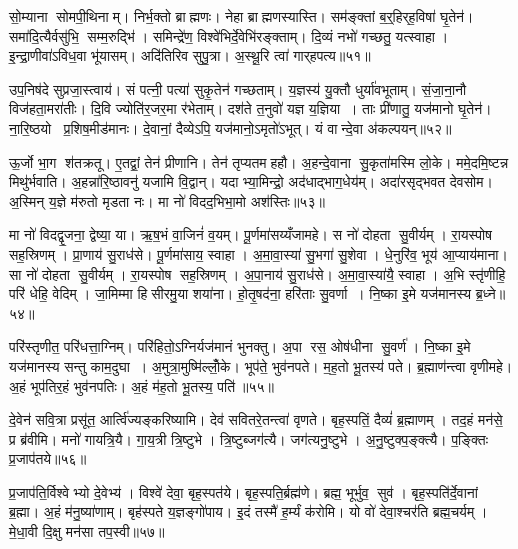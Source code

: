 सो॒म्याना सोमपी॒थिनाम्। निर्भ॒क्तो ब्राह्मणः। नेहा ब्राह्मणस्यास्ति। सम॑ङ्क्तां ब॒र्॒हिर्‌ह॒विषा॑ घृ॒तेन॑। समा॑दि॒त्यैर्वसु॑भि॒ सम्म॒रुद्भि॑। समिन्द्रे॑ण॒ विश्वे॑भिर्दे॒वेभि॑रङ्क्ताम्। दि॒व्यं नभो॑ गच्छतु॒ यत्स्वाहा। इ॒न्द्रा॒णीवा॑ऽविध॒वा भू॑यासम्। अदि॑तिरिव सुपु॒त्रा। अ॒स्थू॒रि त्वा॑ गार्‌हपत्य॥५१॥

उप॒निष॑दे सुप्रजा॒स्त्वाय॑। सं पत्नी॒ पत्या॑ सुकृ॒तेन॑ गच्छताम्। य॒ज्ञस्य॑ यु॒क्तौ धुर्या॑वभूताम्। सं॒जा॒ना॒नौ विज॑हता॒मरा॑तीः। दि॒वि ज्योति॑र॒जर॒मा र॑भेताम्। दश॑ते त॒नुवो॑ यज्ञ य॒ज्ञिया। ताः प्री॑णातु॒ यज॑मानो घृ॒तेन॑। ना॒रि॒ष्ठयो प्र॒शिष॒मीड॑मानः। दे॒वानां॒ दैव्येऽपि॒ यज॑मानो॒ऽमृतो॑ऽभूत्। यं वान्दे॒वा अ॑कल्पयन्॥५२॥

ऊ॒र्जो भा॒ग श॑तक्रतू। ए॒तद्वां॒ तेन॑ प्रीणानि। तेन॑ तृप्यतमहहौ। अ॒हन्दे॒वाना सु॒कृता॑मस्मि लो॒के। ममे॒दमि॒ष्टन्न मिथु॑र्भवाति। अ॒हन्ना॑रि॒ष्ठावनु॑ यजामि वि॒द्वान्। यदाभ्या॒मिन्द्रो॒ अद॑धाद्भाग॒धेय॑म्। अदा॑रसृद्भवत देवसोम। अ॒स्मिन् य॒ज्ञे म॑रुतो मृडता नः। मा नो॑ विदद॒भिभा॒मो अश॑स्तिः॥५३॥

मा नो॑ विदद्वृ॒जना॒ द्वेष्या॒ या। ऋ॒ष॒भं वा॒जिनं॑ व॒यम्। पू॒र्णमा॑सय्यँजामहे। स नो॑ दोहता सु॒वीर्यम्। रा॒यस्पोष सह॒स्रिणम्। प्रा॒णाय॑ सु॒राध॑से। पू॒र्णमा॑साय॒ स्वाहा। अ॒मा॒वा॒स्या॑ सु॒भगा॑ सु॒शेवा। धे॒नुरि॑व॒ भूय॑ आ॒प्याय॑माना। सा नो॑ दोहता सु॒वीर्यम्। रा॒यस्पोष सह॒स्रिणम्। अ॒पा॒नाय॑ सु॒राध॑से। अ॒मा॒वा॒स्या॑यै॒ स्वाहा। अ॒भि स्तृ॑णीहि॒ परि॑ धेहि॒ वेदिम्। जा॒मिम्मा हिसीरमु॒या शया॑ना। हो॒तृ॒षद॑ना॒ हरि॑ताः सु॒वर्णा। नि॒ष्का इ॒मे यज॑मानस्य ब्र॒ध्ने॥५४॥

परि॑स्तृणीत॒ परि॑धत्ता॒ग्निम्। परि॑हितो॒ऽग्निर्यज॑मानं भुनक्तु। अ॒पा रस॒ ओष॑धीना सु॒वर्ण॑। नि॒ष्का इ॒मे यज॑मानस्य सन्तु काम॒दुघा। अ॒मुत्रा॒मुष्मि॑ल्लोँ॒के। भूप॑ते॒ भुव॑नपते। म॒ह॒तो भू॒तस्य॑ पते। ब्र॒ह्माण॑न्त्वा वृणीमहे। अ॒हं भूप॑तिर॒हं भुव॑नपतिः। अ॒हं म॑ह॒तो भू॒तस्य॒ पति॑॥५५॥

दे॒वेन॑ सवि॒त्रा प्रसू॑त॒ आर्त्वि॑ज्यङ्करिष्यामि। देव॑ सवितरे॒तन्त्वा॑ वृणते। बृह॒स्पतिं॒ दैव्यं॑ ब्र॒ह्माणम्। तद॒हं मन॑से॒ प्र ब्र॑वीमि। मनो॑ गायत्रि॒यै। गा॒य॒त्री त्रि॒ष्टुभे। त्रि॒ष्टुब्जग॑त्यै। जग॑त्यनु॒ष्टुभे। अ॒नु॒ष्टुक्प॒ङ्क्त्यै। प॒ङ्क्तिः प्र॒जाप॑तये॥५६॥

प्र॒जाप॑ति॒र्विश्वेभ्यो दे॒वेभ्य॑। विश्वे॑ देवा॒ बृह॒स्पत॑ये। बृह॒स्पति॒र्ब्रह्म॑णे। ब्रह्म॒ भूर्भुव॒ सुव॑। बृह॒स्पति॑र्दे॒वानां ब्र॒ह्मा। अ॒हं म॑नु॒ष्या॑णाम्। बृह॑स्पते य॒ज्ञङ्गो॑पाय। इ॒दं तस्मै॑ ह॒र्म्यं क॑रोमि। यो वो॑ देवा॒श्चर॑ति ब्रह्म॒चर्यम्। मे॒धा॒वी दि॒क्षु मन॑सा तप॒स्वी॥५७॥

